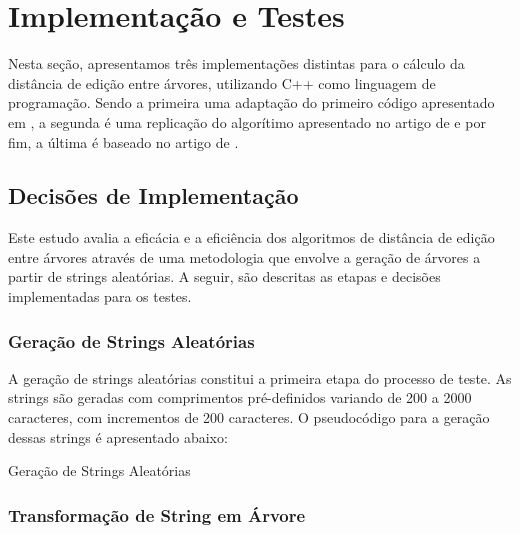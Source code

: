 \documentclass[12pt]{article}
\begin{document}
\section{Implementação e Testes}
Nesta seção, apresentamos três implementações distintas para o cálculo da distância de edição entre árvores, utilizando C++ como linguagem de programação. Sendo a primeira uma adaptação do primeiro código apresentado em \cite{geeksforgeeks2023edit}, a segunda é uma replicação do algorítimo apresentado no artigo de \cite{tai1979tree} e por fim, a última é baseado no artigo de \cite{zhang1989simple}.

\subsection{Decisões de Implementação}

Este estudo avalia a eficácia e a eficiência dos algoritmos de distância de edição entre árvores através de uma metodologia que envolve a geração de árvores a partir de strings aleatórias. A seguir, são descritas as etapas e decisões implementadas para os testes.

\subsubsection{Geração de Strings Aleatórias}

A geração de strings aleatórias constitui a primeira etapa do processo de teste. As strings são geradas com comprimentos pré-definidos variando de 200 a 2000 caracteres, com incrementos de 200 caracteres. O pseudocódigo para a geração dessas strings é apresentado abaixo:


\begin{algorithm}[H]
\caption{Geração de Strings Aleatórias}
\end{algorithm}


\subsubsection{Transformação de String em Árvore}
\end{document}

